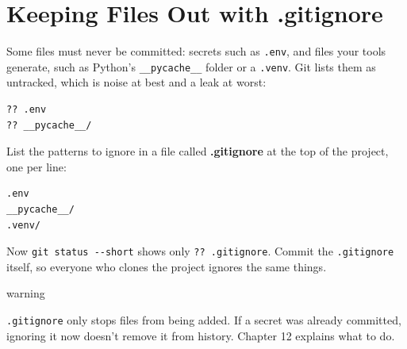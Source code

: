 \section{Keeping Files Out with .gitignore}\label{08-git-every-day:keeping-files-out-with-gitignore}

Some files must never be committed: secrets such as \texttt{.env}, and files your tools generate, such as Python's \texttt{\_\_pycache\_\_} folder or a \texttt{.venv}. Git lists them as untracked, which is noise at best and a leak at worst:

\begin{codeblock}

\begin{Shaded}
\begin{Highlighting}[]
\end{Highlighting}
\end{Shaded}

\end{codeblock}

\begin{codeblock}
\begin{Verbatim}[formatcom=\outputstyle]
?? .env
?? __pycache__/
\end{Verbatim}
\end{codeblock}


List the patterns to ignore in a file called \textbf{.gitignore} at the top of the project, one per line:

\begin{codeblock}
\begin{Verbatim}[formatcom=\outputstyle]
.env
__pycache__/
.venv/
\end{Verbatim}
\end{codeblock}

Now \texttt{git\ status\ -\/-short} shows only \texttt{??\ .gitignore}. Commit the \texttt{.gitignore} itself, so everyone who clones the project ignores the same things.

\begin{callout}{warning}

\texttt{.gitignore} only stops files from being added. If a secret was already committed, ignoring it now doesn't remove it from history. Chapter 12 explains what to do.

\end{callout}

